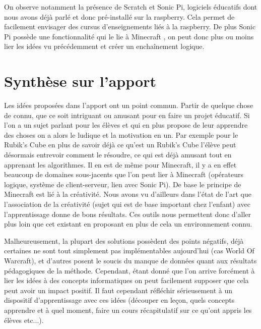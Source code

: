 On observe notamment la présence de Scratch et Sonic Pi, logiciels éducatifs dont nous avons déjà parlé et donc pré-installé sur la raspberry. Cela permet de facilement envisager des cursus d'enseignements liés à la raspberry. De plus Sonic Pi possède une fonctionnalité qui le lie à Minecraft \cite{68}, on peut donc plus ou moins lier les idées vu précédemment et créer un enchaînement logique.

\newpage

\section{Synthèse sur l'apport}

Les idées proposées dans l'apport ont un point commun. Partir de quelque chose de connu, que ce soit intriguant ou amusant pour en faire un projet éducatif. Si l'on a un sujet parlant pour les élèves et qui en plus propose de leur apprendre des choses on a alors le ludique et la motivation en un. Par exemple pour le Rubik's Cube en plus de savoir déjà ce qu'est un Rubik's Cube l'élève peut désormais entrevoir comment le résoudre, ce qui est déjà amusant tout en apprenant les algorithmes. Il en est de même pour Minecraft, il y a en effet beaucoup de domaines sous-jacents que l'on peut lier à Minecraft (opérateurs logique, système de client-serveur, lien avec Sonic Pi). De base le principe de Minecraft est lié à la créativité. Nous avons vu d'ailleurs dans l'état de l'art que l'association de la créativité (sujet qui est de base important chez l'enfant) avec l'apprentissage donne de bons résultats. Ces outils nous permettent donc d'aller plus loin que cet existant en proposant en plus de cela un environnement connu.

Malheureusement, la plupart des solutions possèdent des points négatifs, déjà certaines ne sont tout simplement pas implémentables aujourd'hui (cas World Of Warcraft), et d'autres posent le soucis du manque de données quant aux résultats pédagogiques de la méthode. Cependant, étant donné que l'on arrive forcément à lier les idées à des concepts informatiques on peut facilement supposer que cela peut avoir un impact positif. Il faut cependant réfléchir sérieusement à un dispositif d'apprentissage avec ces idées (découper en leçon, quels concepts apprendre et à quel moment, faire un cours récapitulatif sur ce qu'ont appris les élèves etc...).


